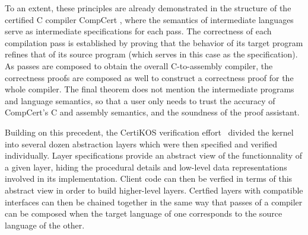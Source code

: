 \documentclass[sigplan,10pt,review,anonymous]{acmart}
\begin{document}

To an extent,
these principles are already demonstrated in the structure of the
certified C compiler CompCert \cite{compcert},
where the semantics of intermediate languages
serve as intermediate specifications for each pass.
The correctness of each compilation pass is established by
proving that the behavior of its target program
refines that of its source program
(which serves in this case as the specification).
As passes are composed to obtain the overall
C-to-assembly compiler,
the correctness proofs are composed as well
to construct a correctness proof for the whole compiler.
The final theorem does not mention the intermediate
programs and language semantics,
so that a user only needs to trust
the accuracy of CompCert's C and assembly semantics,
and the soundness of the proof assistant.

Building on this precedent,
the CertiKOS verification effort~\cite{popl15,ccal,osdi16}
divided the kernel into several dozen abstraction layers
which were then specified and verified individually.
Layer specifications provide
an abstract view of the functionnality of a given layer,
hiding the procedural details and low-level data representations
involved in its implementation.
Client code can then be verfied in terms of
this abstract view
in order to build higher-level layers.
Certfied layers
with compatible interfaces can then be chained together
in the same way that passes of a compiler
can be composed when the target language of one
corresponds to the source language of the other.
\end{document}
